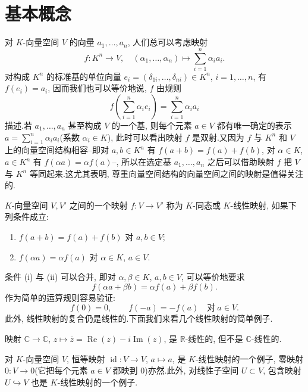 \section{基本概念}\label{sec:2.1}

对 $K$-向量空间 $V$ 的向量 $a_1, \ldots, a_n$, 人们总可以考虑映射
\[
f \colon K^n \longrightarrow V, \quad (\alpha_1, \ldots, \alpha_n) \longmapsto \sum_{i = 1}^{n} \alpha_i a_i\text{.}
\]
对构成 $K^n$ 的标准基的单位向量 $e_i = (\delta_{1i}, \ldots, \delta_{ni}) \in K^n$, $i = 1, \ldots, n$, 有 $f(e_i) = a_i$, 因而我们也可以等价地说, $f$ 由规则
\[
f\left(\sum_{i = 1}^{n} \alpha_i e_i\right) = \sum_{i = 1}^{n} \alpha_i a_i
\]
描述.若 $a_1, \ldots, a_n$ 甚至构成 $V$ 的一个基, 则每个元素 $a \in V$ 都有唯一确定的表示 $a = \sum_{i = 1}^{n} \alpha_i a_i$(系数 $\alpha_i \in K$), 此时可以看出映射 $f$ 是双射.又因为 $f$ 与 $K^n$ 和 $V$ 上的向量空间结构相容--即对 $a, b \in K^n$ 有 $f(a + b) = f(a) + f(b)$, 对 $\alpha \in K$, $a \in K^n$ 有 $f(\alpha a) = \alpha f(a)$--, 所以在选定基 $a_1, \ldots, a_n$ 之后可以借助映射 $f$ 把 $V$ 与 $K^n$ 等同起来.这尤其表明, 尊重向量空间结构的向量空间之间的映射是值得关注的.

\begin{definition}[$K$-线性映射]\label{def:2.1.1}
$K$-向量空间 $V, V'$ 之间的一个映射 $f \colon V \longrightarrow V'$ 称为 $K$-同态或 $K$-线性映射, 如果下列条件成立:
\begin{enumerate}
\item[(i)] $f(a + b) = f(a) + f(b)$ 对 $a, b \in V$;
\item[(ii)] $f(\alpha a) = \alpha f(a)$ 对 $\alpha \in K$, $a \in V$.
\end{enumerate}
\end{definition}

条件 (i) 与 (ii) 可以合并, 即对 $\alpha, \beta \in K$, $a, b \in V$, 可以等价地要求
\[
f(\alpha a + \beta b) = \alpha f(a) + \beta f(b)\text{.}
\]
作为简单的运算规则容易验证:
\[
f(0) = 0, \qquad f(-a) = -f(a) \quad \text{对} \ a \in V\text{.}
\]
此外, 线性映射的复合仍是线性的.下面我们来看几个线性映射的简单例子.

\begin{bsp}\label{bsp:2.1.1}
映射 $\mathbb{C} \longrightarrow \mathbb{C}$, $z \longmapsto \bar{z} = \operatorname{Re}(z) - i\operatorname{Im}(z)$, 是 $\mathbb{R}$-线性的, 但不是 $\mathbb{C}$-线性的.
\end{bsp}

\begin{bsp}\label{bsp:2.1.2}
对 $K$-向量空间 $V$, 恒等映射 $\operatorname{id} \colon V \longrightarrow V$, $a \longmapsto a$, 是 $K$-线性映射的一个例子, 零映射 $0 \colon V \longrightarrow 0$(它把每个元素 $a \in V$ 都映到 $0$)亦然.此外, 对线性子空间 $U \subset V$, 包含映射 $U \hookrightarrow V$ 也是 $K$-线性映射的一个例子.
\end{bsp}

